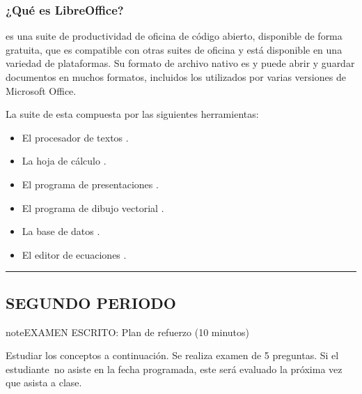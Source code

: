 \documentclass[letterpaper,10pt,spanish]{sphinxmanual}
\begin{document}
\subsubsection{¿Qué es LibreOffice?}
\label{\detokenize{1_guias/10ofimatica/G1019:que-es-libreoffice}}
\sphinxAtStartPar
{} es una suite de productividad de oficina de código abierto, disponible de forma gratuita, que es compatible con otras suites de oficina y está disponible en una variedad de plataformas. Su formato de archivo nativo es  y puede abrir y guardar documentos en muchos formatos, incluidos los utilizados por varias versiones de Microsoft Office.

\sphinxAtStartPar
La suite de  esta compuesta por las siguientes herramientas:
\begin{itemize}
\item {} 
\sphinxAtStartPar
El procesador de textos .

\item {} 
\sphinxAtStartPar
La hoja de cálculo .

\item {} 
\sphinxAtStartPar
El programa de presentaciones .

\item {} 
\sphinxAtStartPar
El programa de dibujo vectorial .

\item {} 
\sphinxAtStartPar
La base de datos .

\item {} 
\sphinxAtStartPar
El editor de ecuaciones .

\end{itemize}


\bigskip\hrule\bigskip



\subsection{SEGUNDO PERIODO}
\label{\detokenize{1_guias/10ofimatica/G1019:segundo-periodo}}
\begin{sphinxadmonition}{note}{EXAMEN ESCRITO: Plan de refuerzo (10 minutos)}

\sphinxAtStartPar
Estudiar los conceptos a continuación. Se realiza examen de 5 preguntas. Si el estudiante no asiste en la fecha programada, este será evaluado la próxima vez que asista a clase.
\end{sphinxadmonition}
\end{document}
